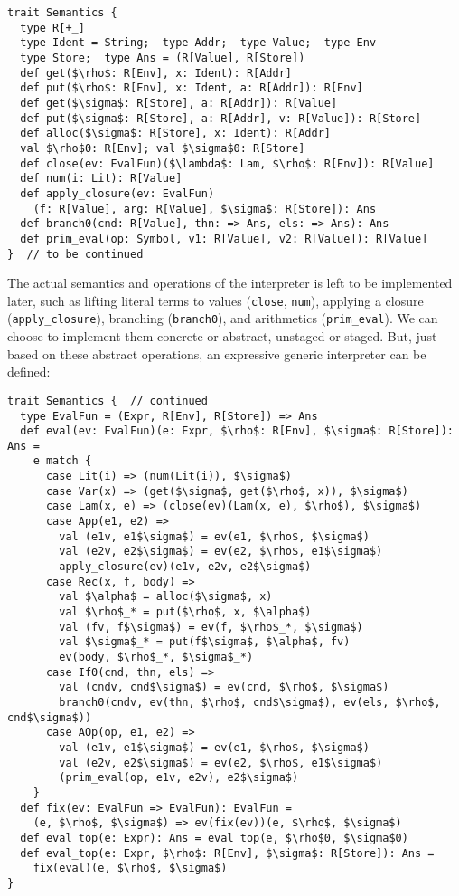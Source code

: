 \begin{lstlisting}
trait Semantics {
  type R[+_]
  type Ident = String;  type Addr;  type Value;  type Env
  type Store;  type Ans = (R[Value], R[Store])
  def get($\rho$: R[Env], x: Ident): R[Addr]
  def put($\rho$: R[Env], x: Ident, a: R[Addr]): R[Env]
  def get($\sigma$: R[Store], a: R[Addr]): R[Value]
  def put($\sigma$: R[Store], a: R[Addr], v: R[Value]): R[Store]
  def alloc($\sigma$: R[Store], x: Ident): R[Addr]
  val $\rho$0: R[Env]; val $\sigma$0: R[Store]
  def close(ev: EvalFun)($\lambda$: Lam, $\rho$: R[Env]): R[Value]
  def num(i: Lit): R[Value]
  def apply_closure(ev: EvalFun)
    (f: R[Value], arg: R[Value], $\sigma$: R[Store]): Ans
  def branch0(cnd: R[Value], thn: => Ans, els: => Ans): Ans
  def prim_eval(op: Symbol, v1: R[Value], v2: R[Value]): R[Value]
}  // to be continued
\end{lstlisting}

The actual semantics and operations of the interpreter is left to be implemented later, 
such as lifting literal terms to values (\texttt{close}, \texttt{num}), 
applying a closure (\texttt{apply\_closure}), branching (\texttt{branch0}),
and arithmetics (\texttt{prim\_eval}). We can choose to implement them concrete or abstract,
unstaged or staged.
But, just based on these abstract operations, an expressive generic interpreter can be defined:

\begin{lstlisting}
trait Semantics {  // continued
  type EvalFun = (Expr, R[Env], R[Store]) => Ans
  def eval(ev: EvalFun)(e: Expr, $\rho$: R[Env], $\sigma$: R[Store]): Ans = 
    e match {
      case Lit(i) => (num(Lit(i)), $\sigma$)
      case Var(x) => (get($\sigma$, get($\rho$, x)), $\sigma$)
      case Lam(x, e) => (close(ev)(Lam(x, e), $\rho$), $\sigma$)
      case App(e1, e2) =>
        val (e1v, e1$\sigma$) = ev(e1, $\rho$, $\sigma$)
        val (e2v, e2$\sigma$) = ev(e2, $\rho$, e1$\sigma$)
        apply_closure(ev)(e1v, e2v, e2$\sigma$)
      case Rec(x, f, body) =>
        val $\alpha$ = alloc($\sigma$, x)
        val $\rho$_* = put($\rho$, x, $\alpha$)
        val (fv, f$\sigma$) = ev(f, $\rho$_*, $\sigma$)
        val $\sigma$_* = put(f$\sigma$, $\alpha$, fv)
        ev(body, $\rho$_*, $\sigma$_*)
      case If0(cnd, thn, els) =>
        val (cndv, cnd$\sigma$) = ev(cnd, $\rho$, $\sigma$)
        branch0(cndv, ev(thn, $\rho$, cnd$\sigma$), ev(els, $\rho$, cnd$\sigma$))
      case AOp(op, e1, e2) =>
        val (e1v, e1$\sigma$) = ev(e1, $\rho$, $\sigma$)
        val (e2v, e2$\sigma$) = ev(e2, $\rho$, e1$\sigma$)
        (prim_eval(op, e1v, e2v), e2$\sigma$)
    }
  def fix(ev: EvalFun => EvalFun): EvalFun = 
    (e, $\rho$, $\sigma$) => ev(fix(ev))(e, $\rho$, $\sigma$)
  def eval_top(e: Expr): Ans = eval_top(e, $\rho$0, $\sigma$0)
  def eval_top(e: Expr, $\rho$: R[Env], $\sigma$: R[Store]): Ans = 
    fix(eval)(e, $\rho$, $\sigma$)
}
\end{lstlisting}

